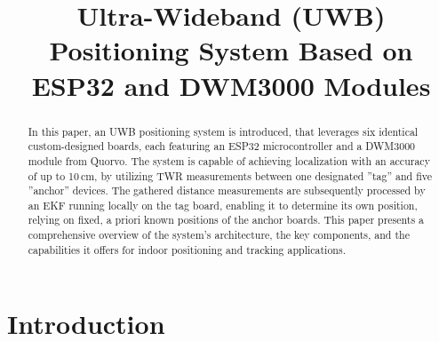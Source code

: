 \documentclass[final, conference, a4paper]{IEEEtran}
\begin{document}
\renewcommand{\baselinestretch}{0.97} %

\title{Ultra-Wideband (UWB) Positioning System Based on ESP32 and DWM3000 Modules}

\author{
	\and
	\authorblockA{\textcolor{red}{hier noch deine normale mail.}}
}

\maketitle

\begin{abstract}
  In this paper, an \ac{UWB} positioning system is introduced, that leverages six identical custom-designed boards, each featuring an ESP32 microcontroller and a DWM3000 module from Quorvo.
  \newline
  The system is capable of achieving localization with an accuracy of up to 10\,cm, by utilizing \ac{TWR} measurements between one designated ''tag'' and five ''anchor'' devices.
  The gathered distance measurements are subsequently processed by an \ac{EKF} running locally on the tag board, enabling it to determine its own position,
  relying on fixed, a priori known positions of the anchor boards.
  \newline
  This paper presents a comprehensive overview of the system's architecture, the key components, and the capabilities it offers for indoor positioning and tracking applications.
\end{abstract}


\IEEEpeerreviewmaketitle


\section{Introduction}
\label{sec:Introduction}
\end{document}
